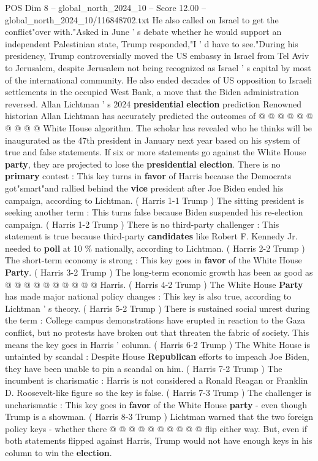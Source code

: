 \begin{textsample}{POS Dim 8 – global\_north\_2024\_10 – Score 12.00 – global\_north\_2024\_10/116848702.txt}
He also called on Israel to get the conflict"over with."Asked in June ' s debate whether he would support an independent Palestinian state, Trump responded,"I ' d have to see."During his presidency, Trump controversially moved the US embassy in Israel from Tel Aviv to Jerusalem, despite Jerusalem not being recognized as Israel ' s capital by most of the international community.
He also ended decades of US opposition to Israeli settlements in the occupied West Bank, a move that the Biden administration reversed.
Allan Lichtman ' s 2024 \textbf{presidential} \textbf{election} prediction Renowned historian Allan Lichtman has accurately predicted the outcomes of @ @ @ @ @ @ @ @ @ @ White House algorithm.
The scholar has revealed who he thinks will be inaugurated as the 47th president in January next year based on his system of true and false statements.
If six or more statements go against the White House \textbf{party}, they are projected to lose the \textbf{presidential} \textbf{election}.
There is no \textbf{primary} contest : This key turns in \textbf{favor} of Harris because the Democrats got"smart"and rallied behind the \textbf{vice} president after Joe Biden ended his campaign, according to Lichtman. ( Harris 1-1 Trump ) The sitting president is seeking another term : This turns false because Biden suspended his re-election campaign. ( Harris 1-2 Trump ) There is no third-party challenger : This statement is true because third-party \textbf{candidates} like Robert F.
Kennedy Jr. needed to \textbf{poll} at 10 \% nationally, according to Lichtman. ( Harris 2-2 Trump ) The short-term economy is strong : This key goes in \textbf{favor} of the White House \textbf{Party}. ( Harris 3-2 Trump ) The long-term economic growth has been as good as @ @ @ @ @ @ @ @ @ @ Harris. ( Harris 4-2 Trump ) The White House \textbf{Party} has made major national policy changes : This key is also true, according to Lichtman ' s theory. ( Harris 5-2 Trump ) There is sustained social unrest during the term : College campus demonstrations have erupted in reaction to the Gaza conflict, but no protests have broken out that threaten the fabric of society.
This means the key goes in Harris ' column. ( Harris 6-2 Trump ) The White House is untainted by scandal : Despite House \textbf{Republican} efforts to impeach Joe Biden, they have been unable to pin a scandal on him. ( Harris 7-2 Trump ) The incumbent is charismatic : Harris is not considered a Ronald Reagan or Franklin D.
Roosevelt-like figure so the key is false. ( Harris 7-3 Trump ) The challenger is uncharismatic : This key goes in \textbf{favor} of the White House \textbf{party} - even though Trump is a showman. ( Harris 8-3 Trump ) Lichtman warned that the two foreign policy keys - whether there @ @ @ @ @ @ @ @ @ @ flip either way.
But, even if both statements flipped against Harris, Trump would not have enough keys in his column to win the \textbf{election}.

\end{textsample}
